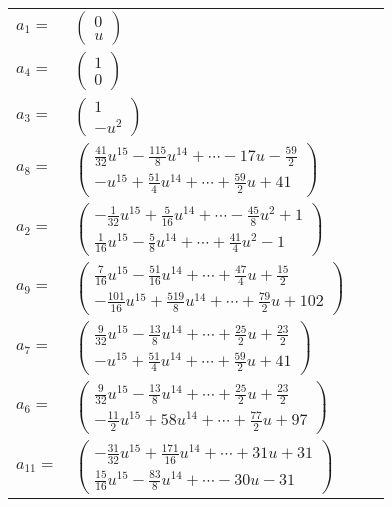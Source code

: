 \documentclass[1p]{elsarticle_modified}
\theoremstyle{definition}
\begin{document}
\begin{tabular}{m{7pt} m{180pt} m{7pt} m{180pt} }
\flushright $a_{1}=$&$\begin{pmatrix}0\\u\end{pmatrix}$ \\
\flushright $a_{4}=$&$\begin{pmatrix}1\\0\end{pmatrix}$ \\
\flushright $a_{3}=$&$\begin{pmatrix}1\\- u^2\end{pmatrix}$ \\
\flushright $a_{8}=$&$\begin{pmatrix}\frac{41}{32} u^{15}-\frac{115}{8} u^{14}+\cdots-17 u-\frac{59}{2}\\- u^{15}+\frac{51}{4} u^{14}+\cdots+\frac{59}{2} u+41\end{pmatrix}$ \\
\flushright $a_{2}=$&$\begin{pmatrix}-\frac{1}{32} u^{15}+\frac{5}{16} u^{14}+\cdots-\frac{45}{8} u^2+1\\\frac{1}{16} u^{15}-\frac{5}{8} u^{14}+\cdots+\frac{41}{4} u^2-1\end{pmatrix}$ \\
\flushright $a_{9}=$&$\begin{pmatrix}\frac{7}{16} u^{15}-\frac{51}{16} u^{14}+\cdots+\frac{47}{4} u+\frac{15}{2}\\-\frac{101}{16} u^{15}+\frac{519}{8} u^{14}+\cdots+\frac{79}{2} u+102\end{pmatrix}$ \\
\flushright $a_{7}=$&$\begin{pmatrix}\frac{9}{32} u^{15}-\frac{13}{8} u^{14}+\cdots+\frac{25}{2} u+\frac{23}{2}\\- u^{15}+\frac{51}{4} u^{14}+\cdots+\frac{59}{2} u+41\end{pmatrix}$ \\
\flushright $a_{6}=$&$\begin{pmatrix}\frac{9}{32} u^{15}-\frac{13}{8} u^{14}+\cdots+\frac{25}{2} u+\frac{23}{2}\\-\frac{11}{2} u^{15}+58 u^{14}+\cdots+\frac{77}{2} u+97\end{pmatrix}$ \\
\flushright $a_{11}=$&$\begin{pmatrix}-\frac{31}{32} u^{15}+\frac{171}{16} u^{14}+\cdots+31 u+31\\\frac{15}{16} u^{15}-\frac{83}{8} u^{14}+\cdots-30 u-31\end{pmatrix}$ \\

\end{tabular}
\end{document}
